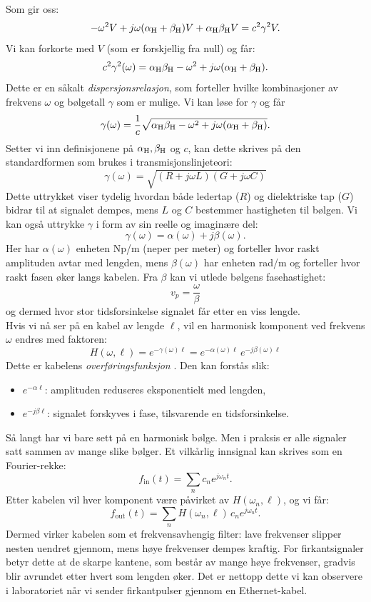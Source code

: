 Som gir oss:
\[    
-\omega^2 V + j\omega(\alpha_{\mathrm{H}}+\beta_{\mathrm{H}})V + \alpha_{\mathrm{H}} \beta_{\mathrm{H}} V = c^2 \gamma^2 V.
\]
Vi kan forkorte med $V$ (som er forskjellig fra null) og får:
\[
c^2 \gamma^2(\omega) = \alpha_{\mathrm{H}} \beta_{\mathrm{H}} - \omega^2 + j\omega(\alpha_{\mathrm{H}}+\beta_{\mathrm{H}}).
\]
\clearpage
\noindent Dette er en såkalt \emph{dispersjonsrelasjon}, som forteller hvilke kombinasjoner av 
frekvens $\omega$ og bølgetall $\gamma$ som er mulige. Vi kan løse for $\gamma$ og får
\[
\gamma(\omega) = \frac{1}{c}\sqrt{\alpha_{\mathrm{H}}\beta_{\mathrm{H}} - \omega^2 + j\omega(\alpha_{\mathrm{H}}+\beta_{\mathrm{H}})}.
\]
Setter vi inn definisjonene på $\alpha_{\mathrm{H}},\beta_{\mathrm{H}}$ og $c$, kan dette skrives på den standardformen
som brukes i transmisjonslinjeteori:
\begin{equation}
\;\gamma(\omega) = \sqrt{(R+j\omega L)(G+j\omega C)}\;
\label{eq:prop-konstant}
\end{equation}
Dette uttrykket viser tydelig hvordan både ledertap ($R$) og dielektriske tap ($G$) bidrar 
til at signalet dempes, mens $L$ og $C$ bestemmer hastigheten til bølgen. Vi kan også uttrykke $\gamma$
i form av sin reelle og imaginære del:
\[
\gamma(\omega) = \alpha(\omega) + j\beta(\omega).
\]
Her har $\alpha(\omega)$ enheten Np/m (neper per meter) og forteller hvor raskt amplituden 
avtar med lengden, mens $\beta(\omega)$ har enheten rad/m og forteller hvor raskt fasen 
øker langs kabelen. Fra $\beta$ kan vi utlede bølgens fasehastighet:
\[v_p = \frac{\omega}{\beta}\]
og dermed hvor stor tidsforsinkelse signalet får etter en viss lengde.\\[1em]
Hvis vi nå ser på en kabel av lengde $\ell$, vil en harmonisk komponent ved frekvens $\omega$ 
endres med faktoren:
\begin{equation}
H(\omega,\ell) = e^{-\gamma(\omega)\ell} = e^{-\alpha(\omega)\ell}\,e^{-j\beta(\omega)\ell}
\end{equation}
Dette er kabelens \emph{overføringsfunksjon} \cite{wikipedia_telegrapher}. 
Den kan forstås slik:
\begin{itemize}
    \item \textbf{$e^{-\alpha \ell}$}: amplituden reduseres eksponentielt med lengden, 
    \item \textbf{$e^{-j\beta \ell}$}: signalet forskyves i fase, tilsvarende en tidsforsinkelse.\\[1em]
\end{itemize}
Så langt har vi bare sett på en harmonisk bølge. Men i praksis er alle signaler satt sammen av mange slike bølger. 
Et vilkårlig innsignal kan skrives som en Fourier-rekke:
\[
f_{\text{in}}(t) = \sum_n c_n e^{j\omega_n t}.
\]
Etter kabelen vil hver komponent være påvirket av $H(\omega_n,\ell)$, og vi får:
\[
f_{\text{out}}(t) = \sum_n H(\omega_n,\ell)\,c_n e^{j\omega_n t}.
\]
Dermed virker kabelen som et frekvensavhengig filter: lave frekvenser slipper nesten uendret gjennom, 
mens høye frekvenser dempes kraftig. For firkantsignaler betyr dette at de skarpe kantene, 
som består av mange høye frekvenser, gradvis blir avrundet etter hvert som lengden øker. 
Det er nettopp dette vi kan observere i laboratoriet når vi sender firkantpulser gjennom en Ethernet-kabel.



